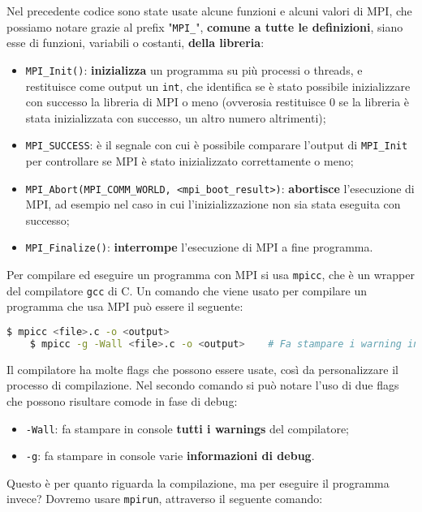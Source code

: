 Nel precedente codice sono state usate alcune funzioni e alcuni valori di MPI, che possiamo notare grazie al prefix "\texttt{MPI\_}", \textbf{comune a tutte le definizioni}, siano esse di funzioni, variabili o costanti, \textbf{della libreria}:
\begin{itemize}
    \item \verb|MPI_Init()|: \textbf{inizializza} un programma su più processi o threads, e restituisce come output un \texttt{int}, che identifica se è stato possibile inizializzare con successo la libreria di MPI o meno (ovverosia restituisce 0 se la libreria è stata inizializzata con successo, un altro numero altrimenti);
    \item \verb|MPI_SUCCESS|: è il segnale con cui è possibile comparare l'output di \verb|MPI_Init| per controllare se MPI è stato inizializzato correttamente o meno;
    \item \verb|MPI_Abort(MPI_COMM_WORLD, <mpi_boot_result>)|: \textbf{abortisce} l'esecuzione di MPI, ad esempio nel caso in cui l'inizializzazione non sia stata eseguita con successo;
    \item \verb|MPI_Finalize()|: \textbf{interrompe} l'esecuzione di MPI a fine programma.
\end{itemize}

Per compilare ed eseguire un programma con MPI si usa \texttt{mpicc}, che è un wrapper del compilatore \texttt{gcc} di C. Un comando che viene usato per compilare un programma che usa MPI può essere il seguente:

\begin{lstlisting}[language = bash, numbers = none, columns=fullflexible]
    $ mpicc <file>.c -o <output>
    $ mpicc -g -Wall <file>.c -o <output>    # Fa stampare i warning in console
\end{lstlisting}

Il compilatore ha molte flags che possono essere usate, così da personalizzare il processo di compilazione. Nel secondo comando si può notare l'uso di due flags che possono risultare comode in fase di debug:
\begin{itemize}
    \item \verb|-Wall|: fa stampare in console \textbf{tutti i warnings} del compilatore;
    \item \verb|-g|: fa stampare in console varie \textbf{informazioni di debug}.
\end{itemize}

Questo è per quanto riguarda la compilazione, ma per eseguire il programma invece? Dovremo usare \texttt{mpirun}, attraverso il seguente comando:

